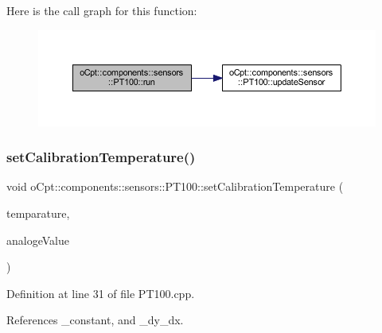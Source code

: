 Here is the call graph for this function\+:\nopagebreak
\begin{figure}[H]
\begin{center}
\leavevmode
\includegraphics[width=350pt]{classo_cpt_1_1components_1_1sensors_1_1_p_t100_a41dfc55a4be7993949feeb5ac013690d_cgraph}
\end{center}
\end{figure}
\hypertarget{classo_cpt_1_1components_1_1sensors_1_1_p_t100_aa809a235b76c237c3a1f66cf9dd7e381}{}\label{classo_cpt_1_1components_1_1sensors_1_1_p_t100_aa809a235b76c237c3a1f66cf9dd7e381} 
\subsubsection{\texorpdfstring{set\+Calibration\+Temperature()}{setCalibrationTemperature()}}
{\footnotesize\ttfamily void o\+Cpt\+::components\+::sensors\+::\+P\+T100\+::set\+Calibration\+Temperature (\begin{DoxyParamCaption}\item[{std\+::pair$<$ \hyperlink{classo_cpt_1_1components_1_1sensors_1_1_p_t100_a46c281d97bd4bd34e16f486a6aeda82e}{Return\+Value\+\_\+t}, \hyperlink{classo_cpt_1_1components_1_1sensors_1_1_p_t100_a46c281d97bd4bd34e16f486a6aeda82e}{Return\+Value\+\_\+t} $>$}]{temparature,  }\item[{std\+::pair$<$ uint16\+\_\+t, uint16\+\_\+t $>$}]{analoge\+Value }\end{DoxyParamCaption})}



Definition at line 31 of file P\+T100.\+cpp.



References \+\_\+constant, and \+\_\+dy\+\_\+dx.

\hypertarget{classo_cpt_1_1components_1_1sensors_1_1_p_t100_a6d80e18a58cf4e1b9b6ce82b441209e2}{}\label{classo_cpt_1_1components_1_1sensors_1_1_p_t100_a6d80e18a58cf4e1b9b6ce82b441209e2} 
